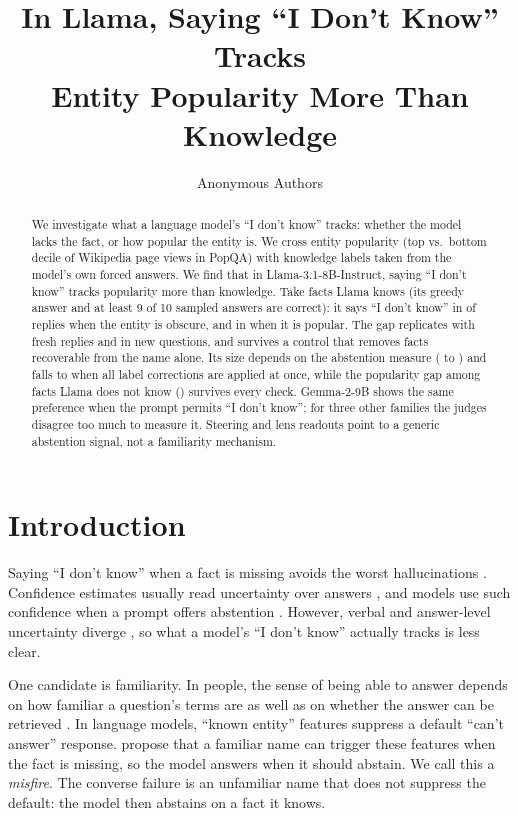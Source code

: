 \documentclass{article}
\title{In Llama, Saying ``I Don't Know'' Tracks\\Entity Popularity More Than Knowledge}
\author{Anonymous Authors}
\newcommand{\idk}{``I don't know''}
\begin{document}
\maketitle

\begin{abstract}
We investigate what a language model's \idk{} tracks: whether the model lacks the fact, or how popular the entity is. We cross entity popularity (top vs.\ bottom decile of Wikipedia page views in PopQA) with knowledge labels taken from the model's own forced answers. We find that in Llama-3.1-8B-Instruct, saying \idk{} tracks popularity more than knowledge. Take facts Llama knows (its greedy answer and at least 9 of 10 sampled answers are correct): it says \idk{} in \tcObsKnownAbsPct{} of replies when the entity is obscure, and in \tcPopKnownAbsPct{} when it is popular. The gap replicates with fresh replies and in new questions, and survives a control that removes facts recoverable from the name alone. Its size depends on the abstention measure (\hjLlamaDiff{} to \faLlamaRegexDiff) and falls to \rcJoint{} \rcJointCI{} when all label corrections are applied at once, while the popularity gap among facts Llama does not know (\rcUnk) survives every check. Gemma-2-9B shows the same preference when the prompt permits \idk; for three other families the judges disagree too much to measure it. Steering and lens readouts point to a generic abstention signal, not a familiarity mechanism.
\end{abstract}

\section{Introduction}

Saying \idk{} when a fact is missing avoids the worst hallucinations \citep{kalai2025hallucinate}. Confidence estimates usually read uncertainty over answers \citep{kadavath2022know,kuhn2023semantic,stolfo2024confidence}, and models use such confidence when a prompt offers abstention \citep{kumaran2026confidence}. However, verbal and answer-level uncertainty diverge \citep{ji2025hedging}, so what a model's \idk{} actually tracks is less clear.

One candidate is familiarity. In people, the sense of being able to answer depends on how familiar a question's terms are as well as on whether the answer can be retrieved \citep{reder1992,schwartz1992,koriat2001cascade}. In language models, ``known entity'' features suppress a default ``can't answer'' response. \citet{lindsey2025biology} propose that a familiar name can trigger these features when the fact is missing, so the model answers when it should abstain. We call this a \emph{misfire}. The converse failure is an unfamiliar name that does not suppress the default: the model then abstains on a fact it knows.
\end{document}
